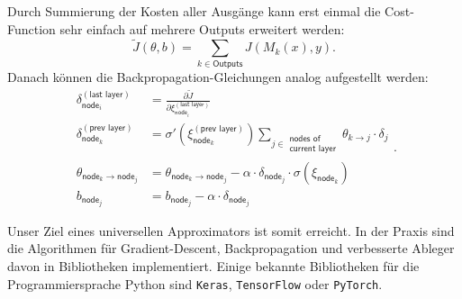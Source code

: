 Durch Summierung der Kosten aller Ausgänge kann erst einmal die Cost-Function sehr einfach
auf mehrere Outputs erweitert werden:
\[
    \tilde J(\theta, b) = \sum_{k\in \textsf{Outputs}} J(M_k(x), y).
\]
Danach können die Backpropagation-Gleichungen analog aufgestellt werden:
\begin{equation}
\begin{aligned}
    \delta_{\textsf{node}_i}^{(\textsf{last layer})} &=
        \frac{\partial \tilde J}{\partial \xi_{\textsf{node}_i}^{(\textsf{last layer})}} \\
    \delta_{\textsf{node}_k}^{(\textsf{prev layer})} &=
        \sigma' \left( \xi_{\textsf{node}_k}^{(\textsf{prev layer})} \right) 
        \sum_{j\in \substack{\textsf{nodes of}\\\textsf{current layer}}}
        \theta_{k\rightarrow j} \cdot \delta_j\\
    \theta_{\textsf{node}_k\rightarrow\textsf{node}_j} &=
        \theta_{\textsf{node}_k\rightarrow\textsf{node}_j} -
        \alpha \cdot \delta_{\textsf{node}_j} \cdot \sigma(\xi_{\textsf{node}_k}) \\
    b_{\textsf{node}_j} &= b_{\textsf{node}_j} - \alpha \cdot \delta_{\textsf{node}_j}
\end{aligned}.
\label{ml:ann:bp:update}
\end{equation}

\bigskip
Unser Ziel eines universellen Approximators ist somit erreicht. In der Praxis sind die
Algorithmen für Gradient-Descent, Backpropagation und verbesserte Ableger davon in
Bibliotheken implementiert. Einige bekannte Bibliotheken für die Programmiersprache Python
sind \texttt{Keras}, \texttt{TensorFlow} oder \texttt{PyTorch}.